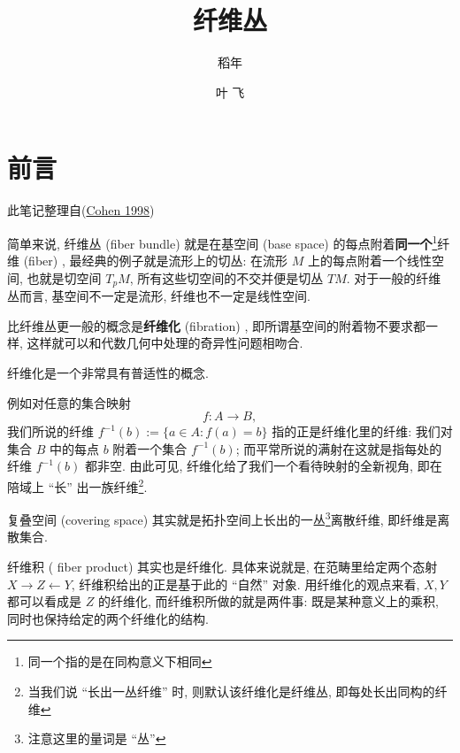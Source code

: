 \documentclass[
  lang=cn,
  titlestyle=hang,
  chinesefont=ctexfont]{elegantbook}
\title{纤维丛}
\author{稻年 \and 叶 飞}
\date{}
\begin{document}
\maketitle

{
\hypersetup{linkcolor=}
\setcounter{tocdepth}{1}
\tableofcontents
}
\listoffigures
\listoftables
\mainmatter

\hypertarget{preface}{%
\chapter*{前言}\label{preface}}

此笔记整理自(\protect\hyperlink{ref-CohenNotes}{Cohen 1998})

简单来说, 纤维丛 (fiber bundle) 就是在基空间 (base space) 的每点附着\textbf{同一个}\footnote{同一个指的是在同构意义下相同}纤维 (fiber) , 最经典的例子就是流形上的切丛: 在流形 \(M\) 上的每点附着一个线性空间, 也就是切空间 \(T_p M\), 所有这些切空间的不交并便是切丛 \(TM\). 对于一般的纤维丛而言, 基空间不一定是流形, 纤维也不一定是线性空间.

比纤维丛更一般的概念是\textbf{纤维化} (fibration) , 即所谓基空间的附着物不要求都一样, 这样就可以和代数几何中处理的奇异性问题相吻合.

纤维化是一个非常具有普适性的概念.

\begin{example}[集合的纤维化]
\protect\hypertarget{exm:preface-set-fiber}{}\label{exm:preface-set-fiber}例如对任意的集合映射 \[
f\colon A\to B,
\] 我们所说的纤维 \(f ^{-1}(b):=\{a\in A : f(a)=b\}\) 指的正是纤维化里的纤维: 我们对集合 \(B\) 中的每点 \(b\) 附着一个集合 \(f^{-1}(b)\); 而平常所说的满射在这就是指每处的纤维 \(f^{-1}(b)\) 都非空. 由此可见, 纤维化给了我们一个看待映射的全新视角, 即在陪域上 ``长'' 出一族纤维\footnote{当我们说 ``长出一丛纤维'' 时, 则默认该纤维化是纤维丛, 即每处长出同构的纤维}.
\end{example}

\begin{example}[复叠空间是纤维丛]
\protect\hypertarget{exm:preface-covering-fiber}{}\label{exm:preface-covering-fiber}复叠空间 (covering space) 其实就是拓扑空间上长出的一丛\footnote{注意这里的量词是 ``丛''}离散纤维, 即纤维是离散集合.
\end{example}

\begin{example}[纤维积是纤维化]
\protect\hypertarget{exm:preface-covering-fiber}{}\label{exm:preface-covering-fiber}纤维积 ( fiber product) 其实也是纤维化. 具体来说就是, 在范畴里给定两个态射 \(X\to Z \leftarrow Y\), 纤维积给出的正是基于此的 ``自然'' 对象. 用纤维化的观点来看, \(X,Y\) 都可以看成是 \(Z\) 的纤维化, 而纤维积所做的就是两件事: 既是某种意义上的乘积, 同时也保持给定的两个纤维化的结构.
\end{example}
\end{document}
